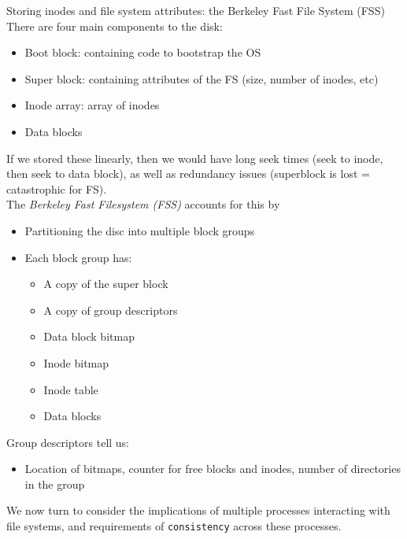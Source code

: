 \documentclass[journal, letterpaper]{IEEEtran}
\begin{document}
\begin{aside}{Storing inodes and file system attributes: the Berkeley Fast File System (FSS)} \\
    There are four main components to the disk:
    \begin{itemize}
        \item Boot block: containing code to bootstrap the OS
        \item Super block: containing attributes of the FS (size, number of inodes, etc)
        \item Inode array: array of inodes
        \item Data blocks
    \end{itemize}
    If we stored these linearly, then we would have long seek times (seek to inode, then seek to data block), as well as redundancy issues (superblock is lost = catastrophic for FS). 
    \newline \\
    The \textit{Berkeley Fast Filesystem (FSS)} accounts for this by
    \begin{itemize}
        \item Partitioning the disc into multiple block groups
        \item Each block group has:
        \begin{itemize}
            \item A copy of the super block
            \item A copy of group descriptors
            \item Data block bitmap
            \item Inode bitmap
            \item Inode table
            \item Data blocks
        \end{itemize}
    \end{itemize}
    Group descriptors tell us:
    \begin{itemize}
        \item Location of bitmaps, counter for free blocks and inodes, number of directories in the group
    \end{itemize}
\end{aside}
We now turn to consider the implications of multiple processes interacting with file systems, and requirements of \verb|consistency| across these processes.
\end{document}
